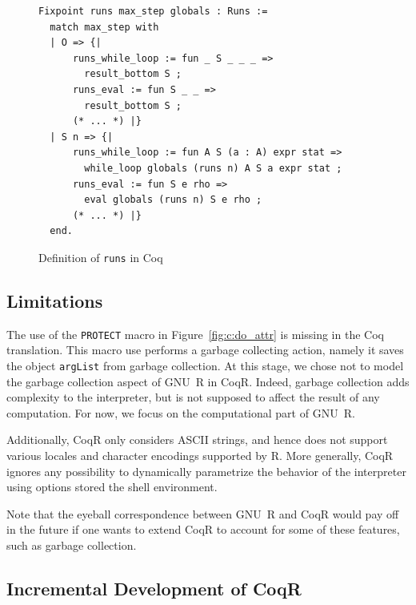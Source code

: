\documentclass[
    sigplan,
    10pt,
    review, %
    natbib=false %
 ]{acmart}
\newcommand\mb[1]{\todo[color=purple!20,size=\scriptsize]{#1}}
\newcommand\CoqR{CoqR}
\begin{document}
\begin{figure}
\begin{verbatim}
Fixpoint runs max_step globals : Runs :=
  match max_step with
  | O => {|
      runs_while_loop := fun _ S _ _ _ =>
        result_bottom S ;
      runs_eval := fun S _ _ =>
        result_bottom S ;
      (* ... *) |}
  | S n => {|
      runs_while_loop := fun A S (a : A) expr stat =>
        while_loop globals (runs n) A S a expr stat ;
      runs_eval := fun S e rho =>
        eval globals (runs n) S e rho ;
      (* ... *) |}
  end.
\end{verbatim}
\vspace{-1em}
    \caption{Definition of \texttt{runs} in Coq}
    \label{fig:runs}
\end{figure}


\subsection{Limitations}
The use of the \texttt{PROTECT} macro in Figure~\ref{fig:c:do_attr} is missing in the Coq translation. This macro use performs a garbage collecting action, namely it saves the object \texttt{argList} from garbage collection.
At this stage, we chose not to model the garbage collection aspect of GNU~R in \CoqR{}. Indeed, garbage collection adds complexity to the interpreter, but is not supposed to affect the result of any computation. For now, we focus on the computational part of GNU~R.

Additionally, \CoqR{} only considers ASCII strings, and hence does not support various locales and character encodings supported by R.
More generally, \CoqR{} ignores any possibility to dynamically
parametrize the behavior of the interpreter using options
stored the shell environment.


Note that the eyeball correspondence between GNU~R and \CoqR{} would pay off in the future if one wants to extend \CoqR{} to account for some of these features, such as garbage collection.



\subsection{Incremental Development of \CoqR{}}
\label{sec:coq:structure}
\end{document}
